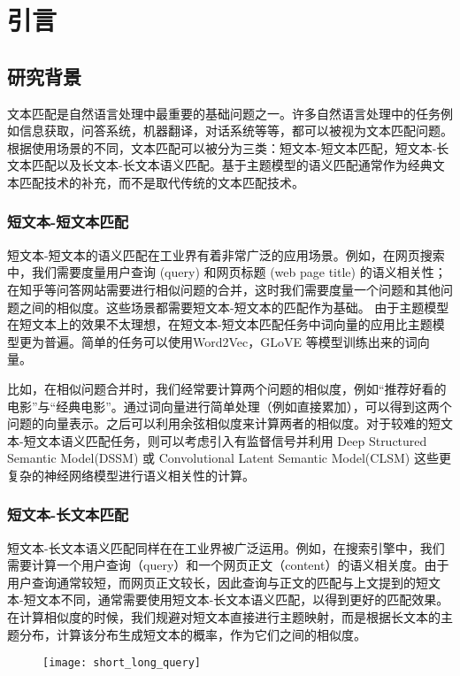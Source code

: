 
\chapter{引言}
\label{chap:introduction}

\section{研究背景}
文本匹配是自然语言处理中最重要的基础问题之一。许多自然语言处理中的任务例如信息获取，问答系统，机器翻译，对话系统等等，都可以被视为文本匹配问题。根据使用场景的不同，文本匹配可以被分为三类：短文本-短文本匹配，短文本-长文本匹配以及长文本-长文本语义匹配。基于主题模型的语义匹配通常作为经典文本匹配技术的补充，而不是取代传统的文本匹配技术。
\subsection{短文本-短文本匹配}
短文本-短文本的语义匹配在工业界有着非常广泛的应用场景。例如，在网页搜索中，我们需要度量用户查询 (query) 和网页标题 (web page title) 的语义相关性；在知乎等问答网站需要进行相似问题的合并，这时我们需要度量一个问题和其他问题之间的相似度。这些场景都需要短文本-短文本的匹配作为基础。 由于主题模型在短文本上的效果不太理想，在短文本-短文本匹配任务中词向量的应用比主题模型更为普遍。简单的任务可以使用Word2Vec，GLoVE 等模型训练出来的词向量。

比如，在相似问题合并时，我们经常要计算两个问题的相似度，例如“推荐好看的电影”与“经典电影”。通过词向量进行简单处理（例如直接累加），可以得到这两个问题的向量表示。之后可以利用余弦相似度来计算两者的相似度。对于较难的短文本-短文本语义匹配任务，则可以考虑引入有监督信号并利用 Deep Structured Semantic Model(DSSM)\citep{Huang2013LearningDS} 或 Convolutional Latent Semantic Model(CLSM)\citep{Shen2014ALS} 这些更复杂的神经网络模型进行语义相关性的计算。

\subsection{短文本-长文本匹配}
短文本-长文本语义匹配同样在在工业界被广泛运用。例如，在搜索引擎中，我们需要计算一个用户查询（query）和一个网页正文（content）的语义相关度。由于用户查询通常较短，而网页正文较长，因此查询与正文的匹配与上文提到的短文本-短文本不同，通常需要使用短文本-长文本语义匹配，以得到更好的匹配效果。在计算相似度的时候，我们规避对短文本直接进行主题映射，而是根据长文本的主题分布，计算该分布生成短文本的概率，作为它们之间的相似度。

\begin{figure}[!htbp]
    \centering
    \texttt{[image: short\_long\_query]}
    \label{fig:user-ad-match}
\end{figure}

